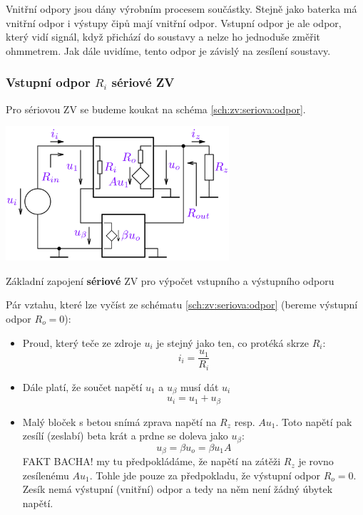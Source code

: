 \documentclass[a4paper,12pt]{article}   %
\begin{document}
Vnitřní odpory jsou dány výrobním procesem součástky. Stejně jako baterka má vnitřní odpor i výstupy čipů mají vnitřní odpor. Vstupní odpor je ale odpor, který vidí signál, když přichází do soustavy a nelze ho jednoduše změřit ohmmetrem. Jak dále uvidíme, tento odpor je závislý na zesílení soustavy.

\subsubsection{Vstupní odpor $R_i$ sériové ZV}
Pro sériovou ZV se budeme koukat na schéma \ref{sch:zv:seriova:odpor}.
\begin{schema}[h!]
    \centering
    \includegraphics[height=5cm]{ZV_seriova-odpory.PNG}
    \caption{Základní zapojení \textbf{sériové} ZV pro výpočet vstupního a výstupního odporu}
    \label{sch:zv:seriova:odpor}
\end{schema}

Pár vztahu, které lze vyčíst ze schématu \ref{sch:zv:seriova:odpor} (bereme výstupní odpor $R_o = 0$):
\begin{itemize}
    \item Proud, který teče ze zdroje $u_i$ je stejný jako ten, co protéká skrze $R_i$:
    \begin{equation}
        i_i = \frac{u_\text{1}}{R_i}
        \label{eq:ri}
    \end{equation}
    \item Dále platí, že součet napětí $u_\text{1}$ a $u_\beta$ musí dát $u_i$
    \begin{equation}
        u_i = u_\text{1} + u_\beta
        \label{eq:soucet:napeti}
    \end{equation}
    \item Malý bloček s betou snímá zprava napětí na $R_z$ resp. $Au_\text{1}$. Toto napětí pak zesílí (zeslabí) beta krát a prdne se doleva jako $u_\beta$:
    \begin{equation}
        u_\beta = \beta u_o = \beta u_\text{1}A
        \label{eq:beta:napeti}
    \end{equation}
    FAKT BACHA! my tu předpokládáme, že napětí na zátěži $R_z$ je rovno zesílenému $Au_\text{1}$. Tohle jde pouze za předpokladu, že výstupní odpor $R_o = 0$. Zesík nemá výstupní (vnitřní) odpor a tedy na něm není žádný úbytek napětí.
\end{itemize}
\end{document}
